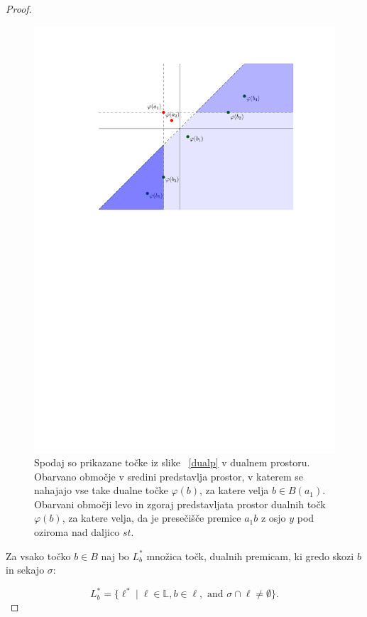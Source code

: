 \documentclass[a4paper, 12pt]{book}
\newcommand{\LL}{\ensuremath{\mathbb L}}
\begin{document}
\begin{proof}
\begin{figure}
\centerline{\includegraphics[scale=1.2]{pics/dual_problem4.pdf}}
\caption{Spodaj so prikazane točke iz slike ~\ref{dualp} v dualnem prostoru. Obarvano območje v sredini predstavlja prostor, v katerem se nahajajo vse take dualne točke $\varphi (b)$, za katere velja $b \in B(a_1)$. Obarvani območji levo in zgoraj predstavljata prostor dualnih točk $\varphi (b)$, za katere velja, da je presečišče premice $a_1b$ z osjo $y$ pod oziroma nad daljico $st$.} 
\label{dualp2}
\end{figure}


Za vsako točko $b\in B$ naj bo $L^* _b$ množica točk, dualnih premicam, ki gredo skozi $b$ in sekajo $\sigma$:

\[
		L^*_b=\{ \ell^* \mid \ell\in \LL, b \in \ell, \text{ and } \sigma\cap \ell\not= \emptyset\}.
	\]


\end{proof}
\end{document}
